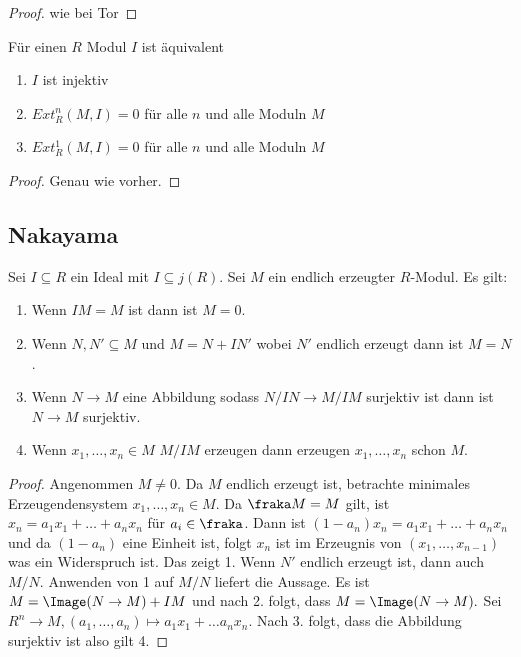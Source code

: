 \begin{proof}
	wie bei Tor
\end{proof}
\begin{Satz} Für einen \(R\) Modul \(I\) ist äquivalent
	\begin{enumerate}
		\item \(I\) ist injektiv
		\item \(Ext_R^n(M,I)=0\) für alle \(n\) und alle Moduln \(M\)
		\item \(Ext_R^1(M,I)=0\) für alle \(n\) und alle Moduln \(M\)
	\end{enumerate}
	
\end{Satz}
\begin{proof}
	Genau wie vorher.
\end{proof}
\subsection{Nakayama}
\begin{Lemma}[Nakayama]\label{Lem:Nakayama}
	Sei \(I\subseteq R\) ein Ideal mit \(I\subseteq j(R)\). Sei \(M\) ein endlich erzeugter \(R\)-Modul. Es gilt:
	\begin{enumerate}
		\item Wenn \(IM=M\) ist dann ist \(M=0\).
		\item Wenn \(N,N'\subseteq M\) und \(M=N+IN'\) wobei \(N'\) endlich erzeugt dann ist \(M=N\).
		\item Wenn \(N\to M\) eine Abbildung sodass \(N/IN\to M/IM\) surjektiv ist dann ist \(N\to M\) surjektiv.
		\item Wenn \(x_1,\dots, x_n\in M\) \(M/IM\) erzeugen dann erzeugen \(x_1,\dots,x_n\) schon \(M\).
		
	\end{enumerate}
	
\end{Lemma}
\begin{proof}
	Angenommen \(M\neq 0\). Da \(M\) endlich erzeugt ist, betrachte minimales Erzeugendensystem \(x_1,\dots,x_n\in M\). Da \(\fraka M=M\) gilt, ist \(x_n=a_1x_1+\dots+a_nx_n\) für \(a_i\in\fraka\). Dann ist \((1-a_n)x_n=a_1x_1+\dots+a_nx_n\) und da \((1-a_n)\) eine Einheit ist, folgt \(x_n\) ist im Erzeugnis von \((x_1,\dots,x_{n-1})\) was ein Widerspruch ist. Das zeigt 1.
	Wenn \(N'\) endlich erzeugt ist, dann auch \(M/N\). Anwenden von 1 auf \(M/N\) liefert die Aussage.
	Es ist \(M=\Image(N\to M)+IM\) und nach 2. folgt, dass \(M=\Image(N\to M).\)
	Sei \(R^n\to M, (a_1,\dots,a_n)\mapsto a_1x_1+\dots a_nx_n\). Nach 3. folgt, dass die Abbildung surjektiv ist also gilt 4.
\end{proof}
